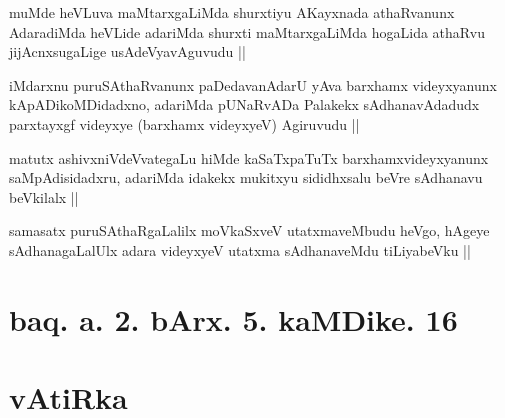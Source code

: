 
\begin{artha}
muMde heVLuva maMtarxgaLiMda shurxtiyu AKayxnada athaRvanunx
AdaradiMda heVLide adariMda shurxti maMtarxgaLiMda hogaLida athaRvu
jijAcnxsugaLige usAdeVyavAguvudu ||
\end{artha}


\begin{artha}
iMdarxnu puruSAthaRvanunx paDedavanAdarU yAva barxhamx videyxyanunx
kApADikoMDidadxno, adariMda pUNaRvADa Palakekx sAdhanavAdadudx
parxtayxgf videyxye (barxhamx videyxyeV) Agiruvudu ||
\end{artha}

\begin{artha}
matutx ashivxniVdeVvategaLu hiMde kaSaTxpaTuTx barxhamxvideyxyanunx
saMpAdisidadxru, adariMda idakekx mukitxyu sididhxsalu beVre sAdhanavu
beVkilalx ||
\end{artha}

\begin{artha}
samasatx puruSAthaRgaLalilx moVkaSxveV utatxmaveMbudu heVgo, hAgeye
sAdhanagaLalUlx adara videyxyeV utatxma sAdhanaveMdu tiLiyabeVku ||
\end{artha}

\section*{baq. a. 2. bArx. 5. kaMDike. 16}

\stext

\section*{vAtiRka}

